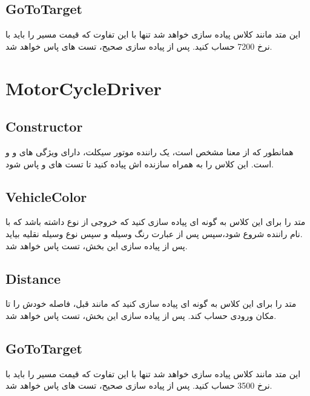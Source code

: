     \subsection{GoToTarget}
    این متد مانند کلاس
    پیاده سازی خواهد شد تنها با این تفاوت که قیمت مسیر را باید با نرخ 7200 حساب کنید.
    پس از پیاده سازی صحیح، تست های 
    \grayBox{\textcolor{dkgreen}{TruckDriverGoToTargetTest}}
    \grayBox{\textcolor{dkgreen}{TruckDriverLocationTest}}
    \grayBox{\textcolor{dkgreen}{TruckDriverExceptionTest}}
    پاس خواهد شد.
    
    
\section{MotorCycleDriver}
    \subsection{Constructor}
    همانطور که از معنا مشخص است، یک راننده موتور سیکلت، دارای ویژگی های 
    و
    و
    است.
     این کلاس را به همراه سازنده اش پیاده کنید تا تست های
    \grayBox{\textcolor{dkgreen}{MotorCycleInheritedInterfacesTest}}
    و
    \grayBox{\textcolor{dkgreen}{MotorCycleConstructorTest}}
    پاس شود.
    
    \subsection{VehicleColor}
    متد 
    را برای این کلاس به گونه ای پیاده سازی کنید که خروجی از نوع
    \grayBox{\textcolor{blue}{string}}
    داشته باشد که با نام راننده شروع شود،سپس پس از عبارت
    رنگ وسیله و سپس نوع وسیله نقلیه بیاید.
    \\
    پس از پیاده سازی این بخش، تست 
    \grayBox{\textcolor{dkgreen}{MotorCycleVehicleTest}}
    پاس خواهد شد.
    
    \subsection{Distance}
    متد 
    را برای این کلاس به گونه ای پیاده سازی کنید که 
    مانند قبل، فاصله خودش را تا مکان ورودی حساب کند.
    پس از پیاده سازی این بخش، تست 
    \grayBox{\textcolor{dkgreen}{MotorCycleDistanceTest}}
    پاس خواهد شد.
    
    \subsection{GoToTarget}
    این متد مانند کلاس
    پیاده سازی خواهد شد تنها با این تفاوت که قیمت مسیر را باید با نرخ 3500 حساب کنید.
    پس از پیاده سازی صحیح، تست های 
    \grayBox{\textcolor{dkgreen}{MotorCycleGoToTargetTest}}
    \grayBox{\textcolor{dkgreen}{MotorCycleLocationTest}}
    \grayBox{\textcolor{dkgreen}{MotorCycleExceptionTest}}
    پاس خواهد شد.
